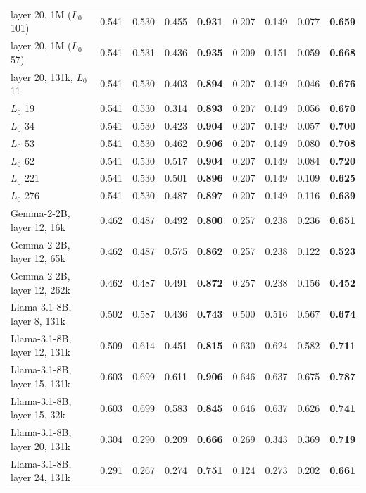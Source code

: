 \begin{tabular}{@{}lrrrrrrrr@{}}
layer 20, 1M ($L_0$ 101) & 0.541 & 0.530 & 0.455 & \textbf{0.931} & 0.207 & 0.149 & 0.077 & \textbf{0.659} \\
layer 20, 1M ($L_0$ 57) & 0.541 & 0.531 & 0.436 & \textbf{0.935} & 0.209 & 0.151 & 0.059 & \textbf{0.668} \\
layer 20, 131k, $L_0$ 11 & 0.541 & 0.530 & 0.403 & \textbf{0.894} & 0.207 & 0.149 & 0.046 & \textbf{0.676} \\
$L_0$ 19 & 0.541 & 0.530 & 0.314 & \textbf{0.893} & 0.207 & 0.149 & 0.056 & \textbf{0.670} \\
$L_0$ 34 & 0.541 & 0.530 & 0.423 & \textbf{0.904} & 0.207 & 0.149 & 0.057 & \textbf{0.700} \\
$L_0$ 53 & 0.541 & 0.530 & 0.462 & \textbf{0.906} & 0.207 & 0.149 & 0.080 & \textbf{0.708} \\
$L_0$ 62 & 0.541 & 0.530 & 0.517 & \textbf{0.904} & 0.207 & 0.149 & 0.084 & \textbf{0.720} \\
$L_0$ 221 & 0.541 & 0.530 & 0.501 & \textbf{0.896} & 0.207 & 0.149 & 0.109 & \textbf{0.625} \\
$L_0$ 276 & 0.541 & 0.530 & 0.487 & \textbf{0.897} & 0.207 & 0.149 & 0.116 & \textbf{0.639} \\
Gemma-2-2B, layer 12, 16k & 0.462 & 0.487 & 0.492 & \textbf{0.800} & 0.257 & 0.238 & 0.236 & \textbf{0.651} \\
Gemma-2-2B, layer 12, 65k & 0.462 & 0.487 & 0.575 & \textbf{0.862} & 0.257 & 0.238 & 0.122 & \textbf{0.523} \\
Gemma-2-2B, layer 12, 262k & 0.462 & 0.487 & 0.491 & \textbf{0.872} & 0.257 & 0.238 & 0.156 & \textbf{0.452} \\
Llama-3.1-8B, layer 8, 131k & 0.502 & 0.587 & 0.436 & \textbf{0.743} & 0.500 & 0.516 & 0.567 & \textbf{0.674} \\
Llama-3.1-8B, layer 12, 131k & 0.509 & 0.614 & 0.451 & \textbf{0.815} & 0.630 & 0.624 & 0.582 & \textbf{0.711} \\
Llama-3.1-8B, layer 15, 131k & 0.603 & 0.699 & 0.611 & \textbf{0.906} & 0.646 & 0.637 & 0.675 & \textbf{0.787} \\
Llama-3.1-8B, layer 15, 32k & 0.603 & 0.699 & 0.583 & \textbf{0.845} & 0.646 & 0.637 & 0.626 & \textbf{0.741} \\
Llama-3.1-8B, layer 20, 131k & 0.304 & 0.290 & 0.209 & \textbf{0.666} & 0.269 & 0.343 & 0.369 & \textbf{0.719} \\
Llama-3.1-8B, layer 24, 131k & 0.291 & 0.267 & 0.274 & \textbf{0.751} & 0.124 & 0.273 & 0.202 & \textbf{0.661} \\

\end{tabular}
